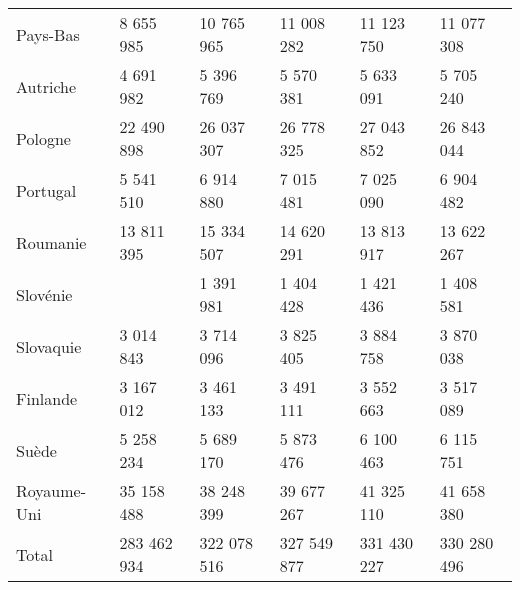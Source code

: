 \begin{table}[h!]
{\begin{tabular}{llllll}
Pays-Bas                            & 8 655 985   & 10 765 965  & 11 008 282  & 11 123 750  & 11 077 308  \\
Autriche                            & 4 691 982   & 5 396 769   & 5 570 381   & 5 633 091   & 5 705 240   \\
Pologne                             & 22 490 898  & 26 037 307  & 26 778 325  & 27 043 852  & 26 843 044  \\
Portugal                            & 5 541 510   & 6 914 880   & 7 015 481   & 7 025 090   & 6 904 482   \\
Roumanie                            & 13 811 395  & 15 334 507  & 14 620 291  & 13 813 917  & 13 622 267  \\
Slovénie                            &             & 1 391 981   & 1 404 428   & 1 421 436   & 1 408 581   \\
Slovaquie                           & 3 014 843   & 3 714 096   & 3 825 405   & 3 884 758   & 3 870 038   \\
Finlande                            & 3 167 012   & 3 461 133   & 3 491 111   & 3 552 663   & 3 517 089   \\
Suède                               & 5 258 234   & 5 689 170   & 5 873 476   & 6 100 463   & 6 115 751   \\
Royaume-Uni                         & 35 158 488  & 38 248 399  & 39 677 267  & 41 325 110  & 41 658 380  \\
Total                               & 283 462 934 & 322 078 516 & 327 549 877 & 331 430 227 & 330 280 496
\end{tabular}}
\end{table}

\newpage
\newpage

